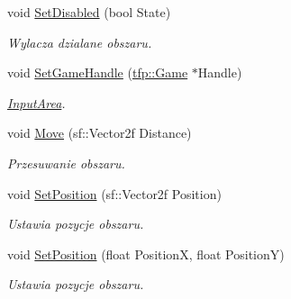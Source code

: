 \begin{DoxyCompactItemize}
void \mbox{\hyperlink{classtfp_1_1_input_area_ac962a42ba6a47804eae2fd98d7d30d3f}{Set\+Disabled}} (bool State)
\begin{DoxyCompactList}\small\item\em Wylacza dzialane obszaru. \end{DoxyCompactList}\item 
\mbox{\label{classtfp_1_1_input_area_a432ae211e90f00df47213e1137a8bffd}} 
void \mbox{\hyperlink{classtfp_1_1_input_area_a432ae211e90f00df47213e1137a8bffd}{Set\+Game\+Handle}} (\mbox{\hyperlink{classtfp_1_1_game}{tfp\+::\+Game}} $\ast$Handle)
\begin{DoxyCompactList}\small\item\em \mbox{\hyperlink{classtfp_1_1_input_area}{Input\+Area}}. \end{DoxyCompactList}\item 
\mbox{\label{classtfp_1_1_input_area_adaebcf5227487eb99fa73675c3972f11}} 
void \mbox{\hyperlink{classtfp_1_1_input_area_adaebcf5227487eb99fa73675c3972f11}{Move}} (sf\+::\+Vector2f Distance)
\begin{DoxyCompactList}\small\item\em Przesuwanie obszaru. \end{DoxyCompactList}\item 
\mbox{\label{classtfp_1_1_input_area_aa240ec0c36f47fd367ef090a6536603a}} 
void \mbox{\hyperlink{classtfp_1_1_input_area_aa240ec0c36f47fd367ef090a6536603a}{Set\+Position}} (sf\+::\+Vector2f Position)
\begin{DoxyCompactList}\small\item\em Ustawia pozycje obszaru. \end{DoxyCompactList}\item 
\mbox{\label{classtfp_1_1_input_area_a84e5e2ab6f6a7d4dd829385baed22e9e}} 
void \mbox{\hyperlink{classtfp_1_1_input_area_a84e5e2ab6f6a7d4dd829385baed22e9e}{Set\+Position}} (float PositionX, float PositionY)
\begin{DoxyCompactList}\small\item\em Ustawia pozycje obszaru. \end{DoxyCompactList}\item 
\mbox{\label{classtfp_1_1_input_area_a3eed53b200f26c41388d2a5f72d67686}} 

\end{DoxyCompactItemize}
